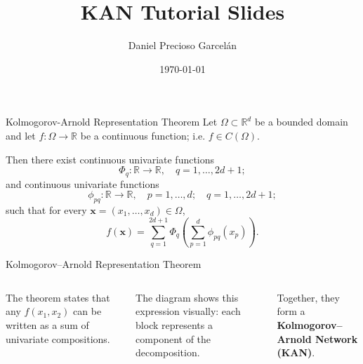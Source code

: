 \documentclass[aspectratio=169]{beamer}
\title[Kolmogorov–Arnold Networks]{KAN Tutorial Slides}
\author[Daniel Precioso]{Daniel Precioso Garcelán}
\date{\today}
\begin{document}
\maketitle

\begin{frame}{Kolmogorov-Arnold Representation Theorem}
Let $ \Omega \subset \mathbb{R}^d $ be a bounded domain and let $ f: \Omega \rightarrow \mathbb{R} $ be a continuous function; i.e. $ f \in C(\Omega) $.

Then there exist continuous univariate functions
$$
\Phi_q: \mathbb{R} \to \mathbb{R}, \quad q = 1, \dots, 2d+1;
$$
and continuous univariate functions
$$
\phi_{pq}: \mathbb{R} \to \mathbb{R}, \quad p = 1, \dots, d; \quad q = 1, \dots, 2d+1;
$$
such that for every $\mathbf{x} = (x_1, \dots, x_d) \in \Omega$,
$$
f(\mathbf{x}) = \sum_{q=1}^{2d+1} \Phi_q \left( \sum_{p=1}^d \phi_{pq}(x_p) \right).
$$
\end{frame}


\begin{frame}{Kolmogorov–Arnold Representation Theorem}
	
	\begin{columns}[T,onlytextwidth]
		
		\centering
		\resizebox{!}{0.8\textheight}{}
		
		The theorem states that any $f(x_1, x_2)$ can be written as a sum of univariate compositions.
		
		\vspace{0.8em}
		The diagram shows this expression visually: each block represents a component of the decomposition.
		
		\vspace{0.8em}
		Together, they form a \textbf{Kolmogorov–Arnold Network (KAN)}.
		
	\end{columns}
	
\end{frame}

\end{document}
